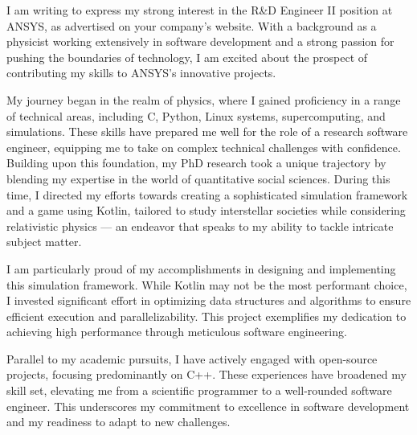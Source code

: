 \documentclass[11pt, a4paper]{awesome-cv}
\begin{document}
\makecvheader[R]

\makecvfooter
  {}%
  {}%
  {}

\makelettertitle

\begin{cvletter}


I am writing to express my strong interest in the R\&D Engineer II position at ANSYS, as advertised on your company's website. With a background as a physicist working extensively in software development and a strong passion for pushing the boundaries of technology, I am excited about the prospect of contributing my skills to ANSYS's innovative projects.

My journey began in the realm of physics, where I gained proficiency in a range of technical areas, including C, Python, Linux systems, supercomputing, and simulations. These skills have prepared me well for the role of a research software engineer, equipping me to take on complex technical challenges with confidence. Building upon this foundation, my PhD research took a unique trajectory by blending my expertise in the world of quantitative social sciences. During this time, I directed my efforts towards creating a sophisticated simulation framework and a game using Kotlin, tailored to study interstellar societies while considering relativistic physics — an endeavor that speaks to my ability to tackle intricate subject matter.

I am particularly proud of my accomplishments in designing and implementing this simulation framework. While Kotlin may not be the most performant choice, I invested significant effort in optimizing data structures and algorithms to ensure efficient execution and parallelizability. This project exemplifies my dedication to achieving high performance through meticulous software engineering.

Parallel to my academic pursuits, I have actively engaged with open-source projects, focusing predominantly on C++. These experiences have broadened my skill set, elevating me from a scientific programmer to a well-rounded software engineer. This underscores my commitment to excellence in software development and my readiness to adapt to new challenges.


\end{cvletter}
\end{document}
